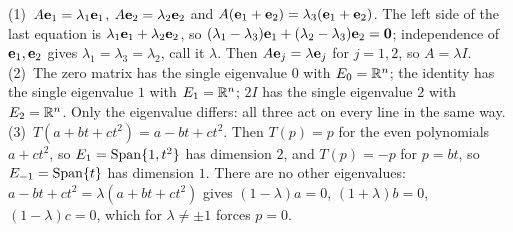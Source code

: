 \documentclass[11pt]{article}
\begin{document}
\begin{description}[leftmargin=0pt,itemsep=5pt]
  \item[Questions to think about.] (1)~$A\mathbf{e}_1=\lambda_1\mathbf{e}_1$, $A\mathbf{e}_2=\lambda_2\mathbf{e}_2$ and $A(\mathbf{e}_1+\mathbf{e}_2)=\lambda_3(\mathbf{e}_1+\mathbf{e}_2)$. The left side of the last equation is $\lambda_1\mathbf{e}_1+\lambda_2\mathbf{e}_2$, so $(\lambda_1-\lambda_3)\mathbf{e}_1+(\lambda_2-\lambda_3)\mathbf{e}_2=\mathbf{0}$; independence of $\mathbf{e}_1,\mathbf{e}_2$ gives $\lambda_1=\lambda_3=\lambda_2$, call it $\lambda$. Then $A\mathbf{e}_j=\lambda\mathbf{e}_j$ for $j=1,2$, so $A=\lambda I$. (2)~The zero matrix has the single eigenvalue $0$ with $E_0=\mathbb{R}^n$; the identity has the single eigenvalue $1$ with $E_1=\mathbb{R}^n$; $2I$ has the single eigenvalue $2$ with $E_2=\mathbb{R}^n$. Only the eigenvalue differs: all three act on every line in the same way. (3)~$T(a+bt+ct^2)=a-bt+ct^2$. Then $T(p)=p$ for the even polynomials $a+ct^2$, so $E_1=\operatorname{Span}\{1,t^2\}$ has dimension $2$, and $T(p)=-p$ for $p=bt$, so $E_{-1}=\operatorname{Span}\{t\}$ has dimension $1$. There are no other eigenvalues: $a-bt+ct^2=\lambda(a+bt+ct^2)$ gives $(1-\lambda)a=0$, $(1+\lambda)b=0$, $(1-\lambda)c=0$, which for $\lambda\neq\pm1$ forces $p=0$.
\end{description}
\end{document}
